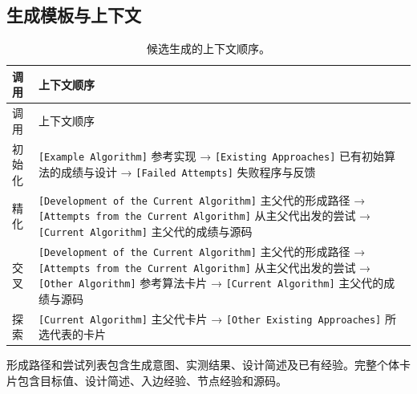 \documentclass{article}
\begin{document}
\subsection{生成模板与上下文}\label{ux751fux6210ux6a21ux677fux4e0eux4e0aux4e0bux6587}

\begin{longtable}[]{@{}
  >{\raggedright\arraybackslash}p{}
  >{\raggedright\arraybackslash}p{}@{}}
\caption{候选生成的上下文顺序。}\tabularnewline
\toprule\noalign{}
\begin{minipage}[b]{\linewidth}\raggedright
调用
\end{minipage} & \begin{minipage}[b]{\linewidth}\raggedright
上下文顺序
\end{minipage} \\
\midrule\noalign{}
\endfirsthead
\toprule\noalign{}
\begin{minipage}[b]{\linewidth}\raggedright
调用
\end{minipage} & \begin{minipage}[b]{\linewidth}\raggedright
上下文顺序
\end{minipage} \\
\midrule\noalign{}
\endhead
\bottomrule\noalign{}
\endlastfoot
初始化 & \texttt{{[}Example\ Algorithm{]}} 参考实现 → \texttt{{[}Existing\ Approaches{]}} 已有初始算法的成绩与设计 → \texttt{{[}Failed\ Attempts{]}} 失败程序与反馈 \\
精化 & \texttt{{[}Development\ of\ the\ Current\ Algorithm{]}} 主父代的形成路径 → \texttt{{[}Attempts\ from\ the\ Current\ Algorithm{]}} 从主父代出发的尝试 → \texttt{{[}Current\ Algorithm{]}} 主父代的成绩与源码 \\
交叉 & \texttt{{[}Development\ of\ the\ Current\ Algorithm{]}} 主父代的形成路径 → \texttt{{[}Attempts\ from\ the\ Current\ Algorithm{]}} 从主父代出发的尝试 → \texttt{{[}Other\ Algorithm{]}} 参考算法卡片 → \texttt{{[}Current\ Algorithm{]}} 主父代的成绩与源码 \\
探索 & \texttt{{[}Current\ Algorithm{]}} 主父代卡片 → \texttt{{[}Other\ Existing\ Approaches{]}} 所选代表的卡片 \\
\end{longtable}

形成路径和尝试列表包含生成意图、实测结果、设计简述及已有经验。完整个体卡片包含目标值、设计简述、入边经验、节点经验和源码。
\end{document}
